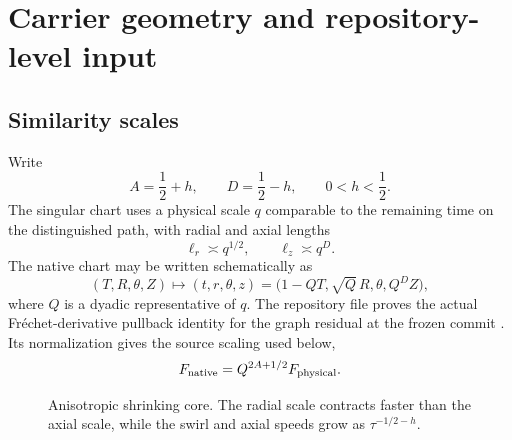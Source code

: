 \documentclass[11pt]{article}
\numberwithin{equation}{section}
\begin{document}
\section{Carrier geometry and repository-level input}

\subsection{Similarity scales}
Write
\begin{equation}
A=\frac12+h,
\qquad
D=\frac12-h,
\qquad
0<h<\frac12.
\label{eq:AD}
\end{equation}
The singular chart uses a physical scale \(q\) comparable to the remaining time on the distinguished path, with radial and axial lengths
\begin{equation}
\ell_r\asymp q^{1/2},
\qquad
\ell_z\asymp q^D.
\label{eq:scales}
\end{equation}
The native chart may be written schematically as
\begin{equation}
(T,R,\theta,Z)\longmapsto
(t,r,\theta,z)=\bigl(1-QT,\sqrt Q\,R,\theta,Q^D Z\bigr),
\label{eq:chart}
\end{equation}
where \(Q\) is a dyadic representative of \(q\).  The repository file  proves the actual Fr\'echet-derivative pullback identity for the graph residual at the frozen commit \cite{OpenAIRepo2026}.  Its normalization gives the source scaling used below,
\begin{equation}
F_{\rm native}=Q^{2A+1/2}F_{\rm physical}.
\label{eq:nativenorm}
\end{equation}

\begin{figure}[ht]
\centering
{}
\caption{Anisotropic shrinking core.  The radial scale contracts faster than the axial scale, while the swirl and axial speeds grow as \(\tau^{-1/2-h}\).}
\label{fig:coregeometry}
\end{figure}
\end{document}
